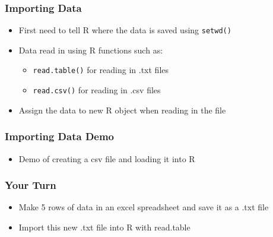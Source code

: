 \documentclass{beamer}\usepackage[]{graphicx}\usepackage[]{color}
\begin{document}

\begin{frame}
    \frametitle{Importing Data}
    \begin{itemize}
        \item First need to tell R where the data is saved using \texttt{setwd()}
        \item Data read in using R functions such as:
            \begin{itemize}
            \item \texttt{read.table()} for reading in .txt files
            \item \texttt{read.csv()} for reading in .csv files
            \end{itemize}
        \item Assign the data to new R object when reading in the file
    \end{itemize}
\end{frame}


\begin{frame}
    \frametitle{Importing Data Demo}
    \begin{itemize}
        \item Demo of creating a csv file and loading it into R
    \end{itemize}
\end{frame}


\begin{frame}
    \frametitle{Your Turn}
    \begin{itemize}
        \item Make 5 rows of data in an excel spreadsheet and save it as a .txt file
        \item Import this new .txt file into R with read.table
    \end{itemize}    
\end{frame}
\end{document}
